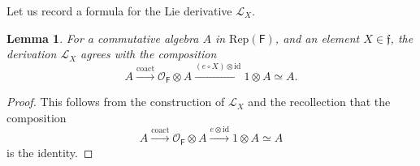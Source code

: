 \documentclass{amsart}
\newtheorem{Lem}[Thm]{Lemma}
\theoremstyle{definition}
\newtheorem{Rem}[Thm]{Remark}
\newcommand{\RepF}{\Rep(\mathsf{F})}
\newcommand{\OOF}{\OO_{\mathsf{F}}}
\newcommand{\Rep}{\on{Rep}}
\newcommand{\OO}{\mathscr{O}}
\newcommand{\on}{\mathrm}
\newcommand{\ff}{\mathfrak{f}}
\numberwithin{equation}{section}
\begin{document}

Let us record a formula for the Lie derivative $\mathscr{L}_X$.

\begin{Lem}\label{l:Liederiv} For a commutative algebra $A$ in $\RepF$, and an element $X \in \ff$, {the derivation} $\mathscr{L}_X$ agrees with the composition 
$$A \xrightarrow{\on{coact}} \OOF \otimes A \xrightarrow{(e \circ X) \otimes \on{id}} 1 \otimes A \simeq A.$$    
\end{Lem}

\begin{proof} This follows from the construction of $\mathscr{L}_X$ and the recollection that the composition $$A \xrightarrow{\on{coact}} \OOF \otimes A \xrightarrow{e \otimes \on{id}} 1 \otimes A \simeq A$$is the identity.  
\end{proof}
\end{document}

